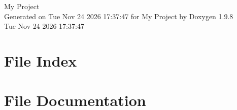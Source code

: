 \documentclass[twoside]{book}
\newcommand{\+}{\discretionary{\mbox{\scriptsize$\hookleftarrow$}}{}{}}
\newcommand{\clearemptydoublepage}{%
    \newpage{\pagestyle{empty}\cleardoublepage}%
  }
\begin{document}
  \raggedbottom
    \hypersetup{pageanchor=false,
                bookmarksnumbered=true,
                pdfencoding=unicode
               }
  \begin{titlepage}
  \vspace*{7cm}
  \begin{center}%
  {\Large My Project}\\
  \vspace*{1cm}
  {\large Generated on Tue Nov 24 2026 17\+:37\+:47 for My Project by Doxygen 1.9.8}\\
    \vspace*{0.5cm}
    {\small Tue Nov 24 2026 17:37:47}
  \end{center}
  \end{titlepage}
  \clearemptydoublepage
  \tableofcontents
  \clearemptydoublepage
  \hypersetup{pageanchor=true}

\chapter{File Index}

\chapter{File Documentation}


  \backmatter
  \newpage
  \clearemptydoublepage
  \printindex
\end{document}
